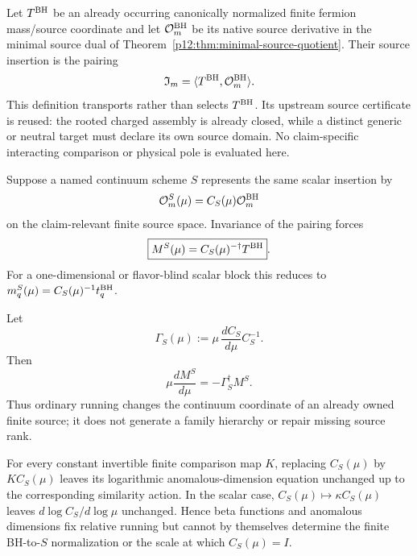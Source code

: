 \documentclass[12pt,a4paper]{article}
\begin{document}
\begin{definition}
\label{p12:def:v288-native-scalar-source-dual}
Let $T^{\rm BH}$ be an already occurring canonically normalized finite
fermion mass/source coordinate and let $\mathcal O_m^{\rm BH}$ be its native
source derivative in the minimal source dual of
Theorem~\ref{p12:thm:minimal-source-quotient}.  Their source insertion is the
pairing
\[
 \mathfrak I_m=\langle T^{\rm BH},\mathcal O_m^{\rm BH}\rangle.
\]
This definition transports rather than selects $T^{\rm BH}$.  Its upstream
source certificate is reused: the rooted charged assembly is already closed,
while a distinct generic or neutral target must declare its own source domain.
No claim-specific interacting comparison or physical pole is evaluated here.
\end{definition}

\begin{proposition}
\label{p12:prop:v288-contragredient-mass-source-transport}
Suppose a named continuum scheme $S$ represents the same scalar insertion by
\[
 \mathcal O_m^S(\mu)=C_S(\mu)\mathcal O_m^{\rm BH}
\]
on the claim-relevant finite source space.  Invariance of the pairing forces
\[
 \boxed{M^S(\mu)=C_S(\mu)^{-\dagger}T^{\rm BH}}.
\]
For a one-dimensional or flavor-blind scalar block this reduces to
$m_q^S(\mu)=C_S(\mu)^{-1}t_q^{\rm BH}$.
\end{proposition}

\begin{corollary}
\label{p12:cor:v288-mass-rge-dual-transport}
Let
\[
 \Gamma_S(\mu):=\mu\,\frac{dC_S}{d\mu}C_S^{-1}.
\]
Then
\[
 \boxed{\mu\frac{dM^S}{d\mu}=-\Gamma_S^\dagger M^S}.
\]
Thus ordinary running changes the continuum coordinate of an already owned
finite source; it does not generate a family hierarchy or repair missing
source rank.
\end{corollary}

\begin{proposition}
\label{p12:prop:v288-finite-normalization-degeneracy}
For every constant invertible finite comparison map $K$, replacing
$C_S(\mu)$ by $KC_S(\mu)$ leaves its logarithmic anomalous-dimension equation
unchanged up to the corresponding similarity action.  In the scalar case,
$C_S(\mu)\mapsto\kappa C_S(\mu)$ leaves
$d\log C_S/d\log\mu$ unchanged.  Hence beta functions and anomalous dimensions
fix relative running but cannot by themselves determine the finite
BH-to-$S$ normalization or the scale at which $C_S(\mu)=I$.
\end{proposition}
\end{document}
